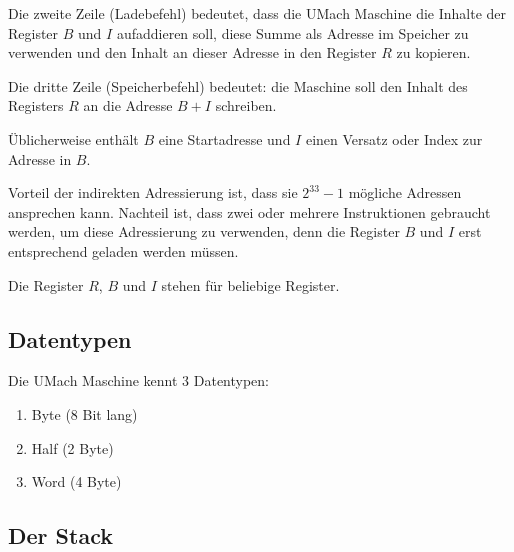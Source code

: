 Die zweite Zeile (Ladebefehl) bedeutet, dass die UMach Maschine die Inhalte der
Register $B$ und $I$ aufaddieren soll, diese Summe als Adresse im
Speicher zu verwenden und den Inhalt an dieser Adresse in den Register $R$ zu
kopieren.

Die dritte Zeile (Speicherbefehl) bedeutet: die Maschine soll den Inhalt des
Registers $R$ an die Adresse $B + I$ schreiben.

Üblicherweise enthält $B$ eine Startadresse und $I$ einen Versatz oder Index zur
Adresse in $B$.

Vorteil der indirekten Adressierung ist, dass sie $2^{33} - 1$ mögliche Adressen
ansprechen kann. Nachteil ist, dass zwei oder mehrere Instruktionen gebraucht
werden, um diese Adressierung zu verwenden, denn die Register $B$ und $I$ erst
entsprechend geladen werden müssen.

Die Register $R$, $B$ und $I$ stehen für beliebige Register.

\subsection{Datentypen}
\label{subsec:Datentypen}

Die UMach Maschine kennt 3 Datentypen:
\begin{enumerate}
  \item Byte (8 Bit lang) 
  \item Half (2 Byte)
  \item Word (4 Byte)
\end{enumerate}



\subsection{Der Stack}
\label{subsec:Stack}

